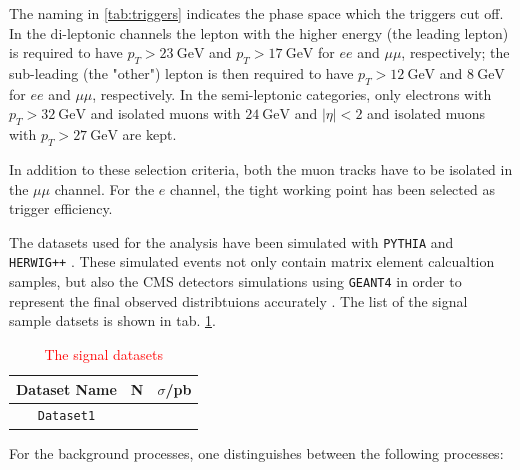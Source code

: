 The naming in \ref{tab:triggers} indicates the phase space which the triggers cut off. In the di-leptonic channels the lepton with the higher energy (the leading lepton) is required to have $p_T > \SI{23}{\giga\electronvolt}$ and $p_T > \SI{17}{\giga\electronvolt}$ for $ee$ and $\mu\mu$, respectively; the sub-leading (the "other") lepton is then required to have $p_T>\SI{12}{\giga\electronvolt}$ and $\SI{8}{\giga\electronvolt}$ for $ee$ and $\mu\mu$, respectively. In the semi-leptonic categories, only electrons with $p_T>\SI{32}{\giga\electronvolt}$ and isolated muons with $\SI{24}{\giga\electronvolt}$ and $|\eta|<2$ and isolated muons with $p_T>\SI{27}{\giga\electronvolt}$ are kept.

In addition to these selection criteria, both the muon tracks have to be isolated in the $\mu\mu$ channel. For the $e$ channel, the tight working point has been selected as trigger efficiency.

The datasets used for the analysis have been simulated with \texttt{PYTHIA} \cite{Sj_strand_2008} and \texttt{HERWIG++} \cite{herwig}. These simulated events not only contain matrix element calcualtion samples, but also the CMS detectors simulations using \texttt{GEANT4} in order to represent the final observed distribtuions accurately \cite{geant1, geant2, geant3}. The list of the signal sample datsets is shown in tab. \ref{tab:signal_datasets}.

\begin{table}[h!]
	\centering
	\begin{tabular}{ccc}
		Dataset Name & N & $\sigma$/pb \\
		\hline
		\texttt{Dataset1} & & \\
	\end{tabular}
	\caption{\textcolor{red}{The signal datasets}}
	\label{tab:signal_datasets}
\end{table}

For the background processes, one distinguishes between the following processes:

